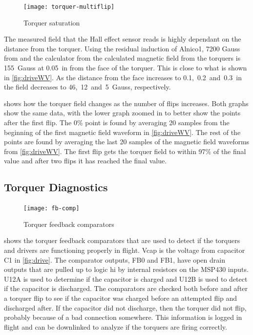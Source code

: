 \begin{figure}[htb!]
    \centering
    \texttt{[image: torquer-multiflip]}
    \caption{Torquer saturation}
    \label{fig:satWV}
\end{figure}

The measured field that the Hall effect sensor reads is highly dependant on the distance from the torquer. Using the residual induction of Alnico1, 7200 Gauss from \cite{AlnicoProp} and the calculator from \cite{DexterField} the calculated magnetic field from the torquers is 155~Gauss at 0.05~in from the face of the torquer. This is close to what is shown in \cref{fig:driveWV}. As the distance from the face increases to 0.1,~0.2~and~0.3~in the field decreases to 46,~12~and~5~Gauss, respectively.

 shows how the torquer field changes as the number of flips increases. Both graphs show the same data, with the lower graph zoomed in to better show the points after the first flip. The 0\% point is found by averaging 20 samples from the beginning of the first magnetic field waveform in \cref{fig:driveWV}. The rest of the points are found by averaging the last 20 samples of the magnetic field waveforms from \cref{fig:driveWV}. The first flip gets the torquer field to within 97\% of the final value and after two flips it has reached the final value. 

\subsection{Torquer Diagnostics}

\begin{figure}[htb!]
    \centering
    \texttt{[image: fb-comp]}
    \caption{Torquer feedback comparators}
    \label{fig:fb-comp}
\end{figure}

 shows the torquer feedback comparators that are used to detect if the torquers and drivers are functioning properly in flight. Vcap is the voltage from capacitor C1 in \cref{fig:drive}. The comparator outputs, FB0 and FB1, have open drain outputs that are pulled up to logic hi by internal resistors on the MSP430 inputs. U12A  is used to determine if the capacitor is charged and U12B is used to detect if the capacitor is discharged. The comparators are checked both before and after a torquer flip to see if the capacitor was charged before an attempted flip and discharged after. If the capacitor did not discharge, then the torquer did not flip, probably because of a bad connection somewhere. This information is logged in flight and can be downlinked to analyze if the torquers are firing correctly.

